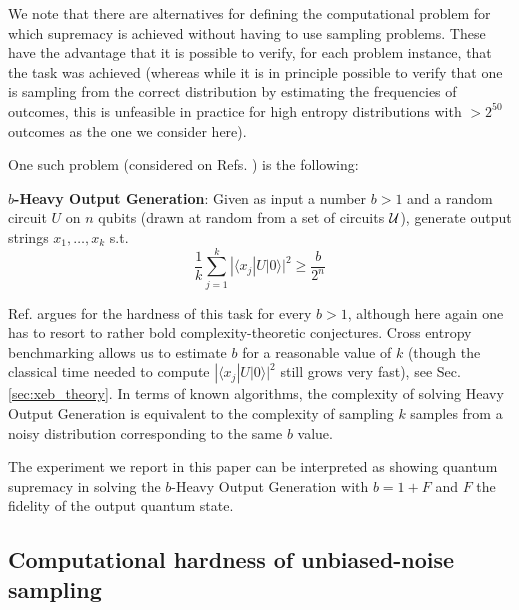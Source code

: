 \vspace{0.2 cm}


We note that there are alternatives for defining the computational problem for which supremacy is achieved without having to use sampling problems. These have the advantage that it is possible to verify, for each problem instance, that the task was achieved (whereas while it is in principle possible to verify that one is sampling from the correct distribution by estimating the frequencies of outcomes, this is unfeasible in practice for high entropy distributions with $>2^{50}$ outcomes as the one we consider here). 

One such problem (considered on Refs. \cite{aaronson2017complexity, boixo2018characterizing}) is the following:

\vspace{0.2 cm}


\noindent \textbf{$b$-Heavy Output Generation}: Given as input a number $b > 1$ and a random circuit $U$ on $n$ qubits (drawn at random from a set of circuits ${\cal U}$), generate output strings $x_1, \ldots, x_k$ s.t. \begin{equation}
\frac{1}{k} \sum_{j=1}^k |\langle x_j | U | 0 \rangle|^2 \geq \frac{b}{2^n}     
\end{equation}

\vspace{0.2 cm}


Ref. \cite{aaronson2017complexity} argues for the hardness of this task for every $b > 1$, although here again one has to resort to rather bold complexity-theoretic conjectures. Cross entropy benchmarking allows us to estimate $b$ for a reasonable value of $k$ (though the classical time needed to compute $|\langle x_j | U | 0 \rangle|^2$ still grows very fast), see Sec. \ref{sec:xeb_theory}. In terms of known algorithms, the complexity of solving Heavy Output Generation is equivalent to the complexity of sampling $k$ samples from a noisy distribution corresponding to the same $b$ value. 

The experiment we report in this paper can be interpreted as showing quantum supremacy in solving the $b$-Heavy Output Generation with $b = 1 + F$ and $F$ the fidelity of the output quantum state.  


\subsection{Computational hardness of unbiased-noise sampling}



